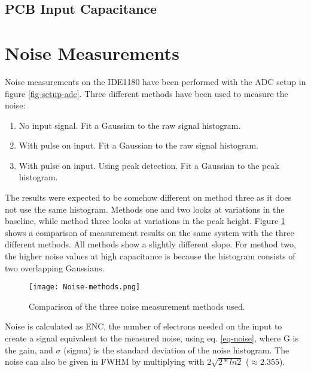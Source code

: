 \documentclass[../main/thesis.tex]{subfiles}
\begin{document}
\subsection{PCB Input Capacitance}
\label{ide-gain-pcb}


\section{Noise Measurements}
\label{ide-noise}

Noise measurements on the IDE1180 have been performed with the ADC setup in figure \ref{fig-setup-adc}. Three different methods have been used to measure the noise:
\begin{enumerate}  
	\item No input signal. Fit a Gaussian to the raw signal histogram. 
	\item With pulse on input. Fit a Gaussian to the raw signal histogram.  
	\item With pulse on input. Using peak detection. Fit a Gaussian to the peak histogram.   
\end{enumerate}

The results were expected to be somehow different on method three as it does not use the same histogram. Methods one and two looks at variations in the baseline, while method three looks at variations in the peak height. Figure \ref{fig-noise-methods} shows a comparison of measurement results on the same system with the three different methods. All methods show a slightly different slope. For method two, the higher noise values at high capacitance is because the histogram consists of two overlapping Gaussians.  %

\begin{figure}%
	\centering
	\texttt{[image: Noise-methods.png]}
	\caption{Comparison of the three noise measurement methods used.}
	\label{fig-noise-methods}
\end{figure} 

Noise is calculated as \acrfull{ENC}, the number of electrons needed on the input to create a signal equivalent to the measured noise, using eq. \ref{eq-noise}, where G is the gain, and $\sigma$ (sigma) is the standard deviation of the noise histogram. The noise can also be given in \gls{FWHM} by multiplying with $2\sqrt{2*ln2}$ ($\approx 2.355$). 
\end{document}
